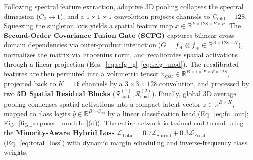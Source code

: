 \documentclass[manuscript,screen,review]{acmart}
\begin{document}
Following spectral feature extraction, adaptive 3D pooling collapses the spectral dimension ($C_2 \to 1$), and a $1\times 1\times 1$ convolution projects channels to $C_{\text{mid}} = 128$. Squeezing the singleton axis yields a spatial feature map $x \in \mathbb{R}^{B \times 128 \times P \times P}$. The \textbf{Second-Order Covariance Fusion Gate (SCFG)} captures bilinear cross-domain dependencies via outer-product interaction ($G = f_{\text{ch}} \otimes f_{\text{sp}} \in \mathbb{R}^{B \times 128 \times N}$), normalizes the matrix via Frobenius norm, and recalibrates spatial activations through a linear projection (Eqs.~\ref{eq:scfg_g}--\ref{eq:scfg_mod}). The recalibrated features are then permuted into a volumetric tensor $v_{\text{spat}} \in \mathbb{R}^{B \times 1 \times P \times P \times 128}$, projected back to $K=16$ channels by a $3\times 3\times 128$ convolution, and processed by two \textbf{3D Spatial Residual Blocks} ($\mathcal{R}_{\text{spat}}^{(1)}, \mathcal{R}_{\text{spat}}^{(2)}$). Finally, global 3D average pooling condenses spatial activations into a compact latent vector $z \in \mathbb{R}^{B \times K}$, mapped to class logits $\hat{y} \in \mathbb{R}^{B \times C_{\text{cls}}}$ by a linear classification head (Eq.~\ref{eq:fc_out}; Fig.~\ref{fig:proposed_modules}(d)). The entire network is trained end-to-end using the \textbf{Minority-Aware Hybrid Loss} $\mathcal{L}_{\text{Total}} = 0.7 \mathcal{L}_{\text{Spread}} + 0.3 \mathcal{L}_{\text{Focal}}$ (Eq.~\ref{eq:total_loss}) with dynamic margin scheduling and inverse-frequency class weights.
\end{document}

